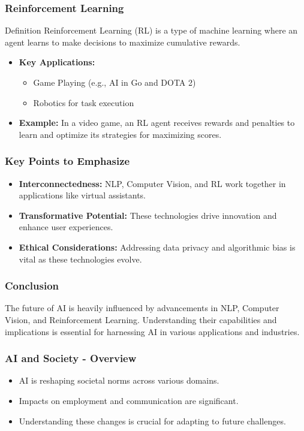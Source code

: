 \documentclass[aspectratio=169]{beamer}
\begin{document}
\begin{frame}[fragile]
    \frametitle{Reinforcement Learning}
    \begin{block}{Definition}
        Reinforcement Learning (RL) is a type of machine learning where an agent learns to make decisions to maximize cumulative rewards.
    \end{block}
    
    \begin{itemize}
        \item \textbf{Key Applications:}
        \begin{itemize}
            \item Game Playing (e.g., AI in Go and DOTA 2)
            \item Robotics for task execution
        \end{itemize}
        
        \item \textbf{Example:}
        In a video game, an RL agent receives rewards and penalties to learn and optimize its strategies for maximizing scores.
    \end{itemize}
\end{frame}

\begin{frame}[fragile]
    \frametitle{Key Points to Emphasize}
    \begin{itemize}
        \item \textbf{Interconnectedness:} NLP, Computer Vision, and RL work together in applications like virtual assistants.
        \item \textbf{Transformative Potential:} These technologies drive innovation and enhance user experiences.
        \item \textbf{Ethical Considerations:} Addressing data privacy and algorithmic bias is vital as these technologies evolve.
    \end{itemize}
\end{frame}

\begin{frame}[fragile]
    \frametitle{Conclusion}
    The future of AI is heavily influenced by advancements in NLP, Computer Vision, and Reinforcement Learning. Understanding their capabilities and implications is essential for harnessing AI in various applications and industries.
\end{frame}

\begin{frame}[fragile]
    \frametitle{AI and Society - Overview}
    \begin{itemize}
        \item AI is reshaping societal norms across various domains.
        \item Impacts on employment and communication are significant.
        \item Understanding these changes is crucial for adapting to future challenges.
    \end{itemize}
\end{frame}
\end{document}
